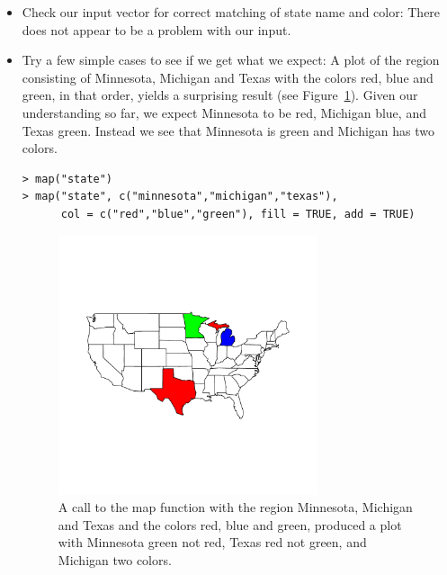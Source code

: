 \begin{itemize}
\item Check our input vector for correct matching of
state name and color: There does not appear to be a problem
with our input.

\item Try a few simple cases to see if we get what we expect:  
A plot of the region consisting of
Minnesota, Michigan and Texas with the colors red, blue and green,
in that order, yields a surprising result (see Figure~\ref{fig:michigantexas}).
Given our understanding so far, we expect Minnesota to be red, Michigan blue, 
and Texas green. Instead we see that Minnesota is green and Michigan has 
two colors. 
 
\begin{verbatim}
> map("state")
> map("state", c("minnesota","michigan","texas"),
      col = c("red","blue","green"), fill = TRUE, add = TRUE)
\end{verbatim}

\begin{figure}
\includegraphics[height=3in]{electionMaps/michigantexas.pdf}
\caption{A call to the map function with the region Minnesota, Michigan and Texas
and the colors red, blue and green, produced a plot with Minnesota green not red,
Texas red not green, and Michigan two colors.}
\label{fig:michigantexas}
\end{figure} 


\end{itemize}
